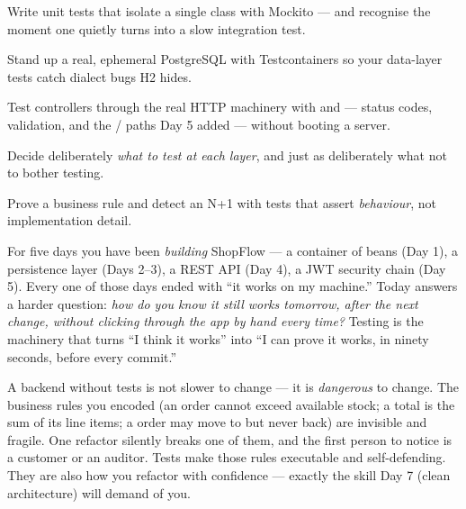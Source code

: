 
\begin{objectives}
\begin{wbitem}
  \item Write unit tests that isolate a single class with Mockito --- and recognise the moment one quietly turns into a slow integration test.
  \item Stand up a real, ephemeral PostgreSQL with Testcontainers so your data-layer tests catch dialect bugs H2 hides.
  \item Test controllers through the real HTTP machinery with  and  --- status codes, validation, and the / paths Day 5 added --- without booting a server.
  \item Decide deliberately \emph{what to test at each layer}, and just as deliberately what not to bother testing.
  \item Prove a business rule and detect an N+1 with tests that assert \emph{behaviour}, not implementation detail.
\end{wbitem}
\end{objectives}


 For five days you have been \emph{building} ShopFlow --- a container of beans (Day 1), a persistence layer (Days 2--3), a REST API (Day 4), a JWT security chain (Day 5). Every one of those days ended with ``it works on my machine.'' Today answers a harder question: \emph{how do you know it still works tomorrow, after the next change, without clicking through the app by hand every time?} Testing is the machinery that turns ``I think it works'' into ``I can prove it works, in ninety seconds, before every commit.''

 A backend without tests is not slower to change --- it is \emph{dangerous} to change. The business rules you encoded (an order cannot exceed available stock; a total is the sum of its line items; a  order may move to  but never back) are invisible and fragile. One refactor silently breaks one of them, and the first person to notice is a customer or an auditor. Tests make those rules executable and self-defending. They are also how you refactor with confidence --- exactly the skill Day 7 (clean architecture) will demand of you.

